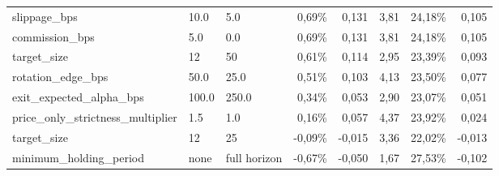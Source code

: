 \begin{longtable}{lllrrrrr}
slippage\_bps & 10.0 & 5.0 & 0,69\% & 0,131 & 3,81 & 24,18\% & 0,105 \\
commission\_bps & 5.0 & 0.0 & 0,69\% & 0,131 & 3,81 & 24,18\% & 0,105 \\
target\_size & 12 & 50 & 0,61\% & 0,114 & 2,95 & 23,39\% & 0,093 \\
rotation\_edge\_bps & 50.0 & 25.0 & 0,51\% & 0,103 & 4,13 & 23,50\% & 0,077 \\
exit\_expected\_alpha\_bps & 100.0 & 250.0 & 0,34\% & 0,053 & 2,90 & 23,07\% & 0,051 \\
price\_only\_strictness\_multiplier & 1.5 & 1.0 & 0,16\% & 0,057 & 4,37 & 23,92\% & 0,024 \\
target\_size & 12 & 25 & -0,09\% & -0,015 & 3,36 & 22,02\% & -0,013 \\
minimum\_holding\_period & none & full horizon & -0,67\% & -0,050 & 1,67 & 27,53\% & -0,102 \\
\end{longtable}
